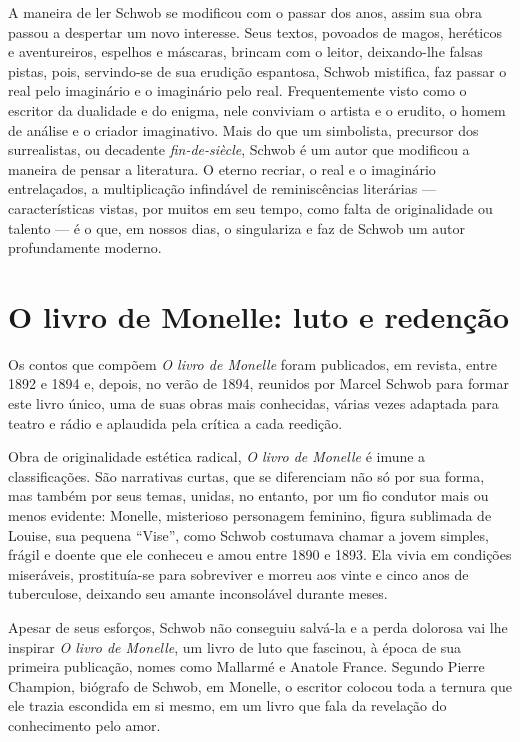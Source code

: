 A maneira de ler Schwob se modificou com o passar dos anos, assim sua obra
passou a despertar um novo interesse. Seus textos, povoados de magos, heréticos
e aventureiros, espelhos e máscaras, brincam com o leitor, deixando-lhe falsas
pistas, pois, servindo-se de sua erudição espantosa, Schwob mistifica, faz
passar o real pelo imaginário e o imaginário pelo real. Frequentemente visto
como o escritor da dualidade e do enigma, nele conviviam o artista e o erudito,
o homem de análise e o criador imaginativo. Mais do que um simbolista,
precursor dos surrealistas, ou decadente \textit{fin-de-siècle}, Schwob é
um autor que modificou a maneira de pensar a literatura. O eterno
recriar, o real e o imaginário entrelaçados, a multiplicação infindável de
reminiscências literárias --- características vistas, por muitos em seu tempo,
como falta de originalidade ou talento --- é o que, em nossos dias, o singulariza
e faz de Schwob um autor profundamente moderno.


\section{O livro de Monelle: luto e redenção}


Os contos que compõem \textit{O livro de Monelle} foram publicados,
em revista, entre 1892 e 1894 e, depois, no verão de 1894, reunidos por Marcel
Schwob para formar este livro único, uma de suas obras mais conhecidas, várias
vezes adaptada para teatro e rádio e aplaudida pela crítica a cada reedição.

Obra de originalidade estética radical, \textit{O livro de Monelle} é imune
a classificações. São narrativas curtas, que se diferenciam não só por sua
forma, mas também por seus temas, unidas, no entanto, por um fio condutor
mais ou menos evidente: Monelle, misterioso personagem feminino, figura
sublimada de Louise, sua pequena “Vise”, como Schwob costumava chamar a
jovem simples, frágil e doente que ele conheceu e amou entre 1890 e 1893. Ela
vivia em condições miseráveis, prostituía-se para sobreviver e morreu aos vinte
e cinco anos de tuberculose, deixando seu amante inconsolável durante meses.

Apesar de seus esforços, Schwob não conseguiu salvá-la e a perda dolorosa
vai lhe inspirar \textit{O livro de Monelle}, um livro de luto que fascinou, à
época de sua primeira publicação, nomes como Mallarmé e Anatole France.
Segundo Pierre Champion, biógrafo de Schwob, em Monelle, o escritor colocou
toda a ternura que ele trazia escondida em si mesmo, em um livro que fala da
revelação do conhecimento pelo amor.

